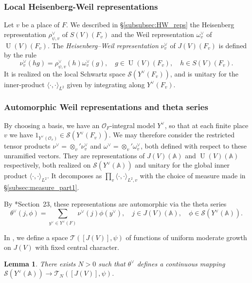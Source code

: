 \documentclass[letterpaper,11pt]{amsart}
\newcommand{\bA}{\mathbb{A}}
\newcommand{\cO}{\mathcal{O}}
\newcommand{\cS}{\mathcal{S}}
\newcommand{\cT}{\mathcal{T}}
\newcommand{\<}{\negthickspace}
\DeclareMathOperator{\U}{U}
\theoremstyle{definition}
\theoremstyle{plain}
\newtheorem{lemma}[definition]{Lemma}
\theoremstyle{remark}
\numberwithin{equation}{section}
\begin{document}
\subsubsection{Local Heisenberg-Weil representations} \label{subsubsec:local_Heisenberg} Let $v$ be a place of $F$. We described in \S\ref{subsubsec:HW_reps} the Heisenberg representation $\rho^\vee_{\psi,v}$ of $S(V)(F_v)$ and the Weil representation $\omega^\vee_v$ of $\U(V)(F_v)$. The \emph{Heisenberg--Weil representation} $\nu^\vee_v$ of $J(V)(F_v)$ is defined by the rule
\begin{equation}
\label{eq:nu_defi1}
    \nu^\vee_v(h g)=\rho^\vee_{\psi,v}(h) \omega^\vee_{v}(g) , \quad  g \in \U(V)(F_v), \quad h \in S(V)(F_v).
\end{equation}
It is realized on the local Schwartz space $\cS(Y^\vee(F_v))$, and is unitary for the inner-product $\langle \cdot, \cdot \rangle_{L^2}$ given by integrating along $Y^\vee(F_v)$.

\subsubsection{Automorphic Weil representations and theta series} \label{subsubsec:automorphic_Weil} By choosing a basis, we have an $\cO_F$-integral model $Y^\vee$, so that at each finite place $v$ we have $1_{Y^\vee(\cO_v)} \in \cS(Y^\vee(F_v))$. We may therefore consider the restricted tensor products $\nu^\vee=\otimes_v' \nu^\vee_v$ and $\omega^\vee=\otimes_v' \omega^\vee_v$, both defined with respect to these unramified vectors. They are representations of $J(V)(\bA)$ and $\U(V)(\bA)$ respectively, both realized on $\cS(Y^\vee(\bA))$ and unitary for the global inner product $\langle \cdot, \cdot \rangle_{L^2}$. It decomposes as $\prod_v \langle \cdot, \cdot \rangle_{L^2,v}$ with the choice of measure made in \S\ref{subsec:measure_part1}.

By \cite{GGP}*{Section~23}, these representations are automorphic via the theta series
\begin{equation}
    \label{eq:Theta_unitary_definition}
     \theta^\vee(j, \phi) = \sum_{y^\vee \in Y^\vee(F)}
    \nu^\vee(j) \phi(y^\vee), \quad j \in J(V)(\bA), \quad
    \phi \in \cS(Y^\vee(\bA)).
\end{equation}

In \cite[Section~3.3.5]{BLX1}, we define a space $\cT([J(V)],\psi)$ of functions of uniform moderate growth on $J(V)$ with fixed central character. 

\begin{lemma}
    \label{lem:theta_moderate_u}
    There exists $N>0$ such that $\theta^\vee$ defines a continuous mapping $\cS(Y^\vee(\bA)) \to \cT_N([J(V)],\psi)$.
\end{lemma}
\end{document}
